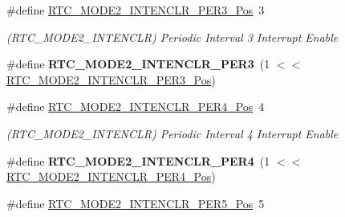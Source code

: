 \begin{DoxyCompactItemize}
\item 
\hypertarget{group___s_a_m_l21___r_t_c_gaa276b8b6dceccbd06f5d79fdd0951232}{}\#define \hyperlink{group___s_a_m_l21___r_t_c_gaa276b8b6dceccbd06f5d79fdd0951232}{R\+T\+C\+\_\+\+M\+O\+D\+E2\+\_\+\+I\+N\+T\+E\+N\+C\+L\+R\+\_\+\+P\+E\+R3\+\_\+\+Pos}~3\label{group___s_a_m_l21___r_t_c_gaa276b8b6dceccbd06f5d79fdd0951232}

\begin{DoxyCompactList}\small\item\em (R\+T\+C\+\_\+\+M\+O\+D\+E2\+\_\+\+I\+N\+T\+E\+N\+C\+L\+R) Periodic Interval 3 Interrupt Enable \end{DoxyCompactList}\item 
\hypertarget{group___s_a_m_l21___r_t_c_gaa0533bd6eec51baa75d1d25aaf9b39b6}{}\#define {\bfseries R\+T\+C\+\_\+\+M\+O\+D\+E2\+\_\+\+I\+N\+T\+E\+N\+C\+L\+R\+\_\+\+P\+E\+R3}~(1 $<$$<$ \hyperlink{group___s_a_m_l21___r_t_c_gaa276b8b6dceccbd06f5d79fdd0951232}{R\+T\+C\+\_\+\+M\+O\+D\+E2\+\_\+\+I\+N\+T\+E\+N\+C\+L\+R\+\_\+\+P\+E\+R3\+\_\+\+Pos})\label{group___s_a_m_l21___r_t_c_gaa0533bd6eec51baa75d1d25aaf9b39b6}

\item 
\hypertarget{group___s_a_m_l21___r_t_c_ga8de2982d726377e2376e3542932b65ea}{}\#define \hyperlink{group___s_a_m_l21___r_t_c_ga8de2982d726377e2376e3542932b65ea}{R\+T\+C\+\_\+\+M\+O\+D\+E2\+\_\+\+I\+N\+T\+E\+N\+C\+L\+R\+\_\+\+P\+E\+R4\+\_\+\+Pos}~4\label{group___s_a_m_l21___r_t_c_ga8de2982d726377e2376e3542932b65ea}

\begin{DoxyCompactList}\small\item\em (R\+T\+C\+\_\+\+M\+O\+D\+E2\+\_\+\+I\+N\+T\+E\+N\+C\+L\+R) Periodic Interval 4 Interrupt Enable \end{DoxyCompactList}\item 
\hypertarget{group___s_a_m_l21___r_t_c_ga3be24598b31ce56a4125055090b48b1a}{}\#define {\bfseries R\+T\+C\+\_\+\+M\+O\+D\+E2\+\_\+\+I\+N\+T\+E\+N\+C\+L\+R\+\_\+\+P\+E\+R4}~(1 $<$$<$ \hyperlink{group___s_a_m_l21___r_t_c_ga8de2982d726377e2376e3542932b65ea}{R\+T\+C\+\_\+\+M\+O\+D\+E2\+\_\+\+I\+N\+T\+E\+N\+C\+L\+R\+\_\+\+P\+E\+R4\+\_\+\+Pos})\label{group___s_a_m_l21___r_t_c_ga3be24598b31ce56a4125055090b48b1a}

\item 
\hypertarget{group___s_a_m_l21___r_t_c_ga4ce272eaec92f36333aabe830051e1d0}{}\#define \hyperlink{group___s_a_m_l21___r_t_c_ga4ce272eaec92f36333aabe830051e1d0}{R\+T\+C\+\_\+\+M\+O\+D\+E2\+\_\+\+I\+N\+T\+E\+N\+C\+L\+R\+\_\+\+P\+E\+R5\+\_\+\+Pos}~5\label{group___s_a_m_l21___r_t_c_ga4ce272eaec92f36333aabe830051e1d0}


\end{DoxyCompactItemize}
